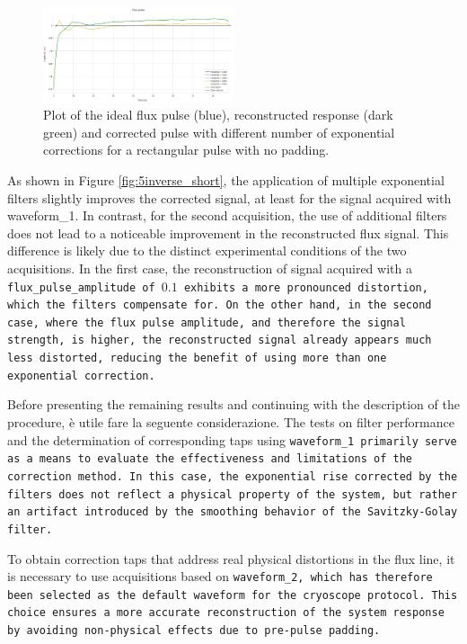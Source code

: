 \begin{figure}[h!]
    \centering
    \includegraphics[width=0.5\textwidth]{figures/png/Cryoscope/filters_long/5_inverse.png}
    \caption{Plot of the ideal flux pulse (blue), reconstructed response (dark green) and corrected pulse with different number of exponential corrections for a rectangular pulse with no padding.}
    \label{fig:5inverse:long}
\end{figure} 

As shown in Figure \ref{fig:5inverse_short}, the application of multiple exponential filters slightly improves the corrected signal, at least for the signal acquired with waveform\_1. 
In contrast, for the second acquisition, the use of additional filters does not lead to a noticeable improvement in the reconstructed flux signal. 
This difference is likely due to the distinct experimental conditions of the two acquisitions. 
In the first case, the reconstruction of signal acquired with a \tt{flux\_pulse\_amplitude} of $0.1$ exhibits a more pronounced distortion, which the filters compensate for. 
On the other hand, in the second case, where the flux pulse amplitude, and therefore the signal strength, is higher, the reconstructed signal already appears much less distorted, reducing the benefit of using more than one exponential correction.

Before presenting the remaining results and continuing with the description of the procedure, è utile fare la seguente considerazione.
The tests on filter performance and the determination of corresponding taps using \tt{waveform\_1} primarily serve as a means to evaluate the effectiveness and limitations of the correction method. 
In this case, the exponential rise corrected by the filters does not reflect a physical property of the system, but rather an artifact introduced by the smoothing behavior of the Savitzky-Golay filter.

To obtain correction taps that address real physical distortions in the flux line, it is necessary to use acquisitions based on \tt{waveform\_2}, which has therefore been selected as the default waveform for the cryoscope protocol. 
This choice ensures a more accurate reconstruction of the system response by avoiding non-physical effects due to pre-pulse padding.

